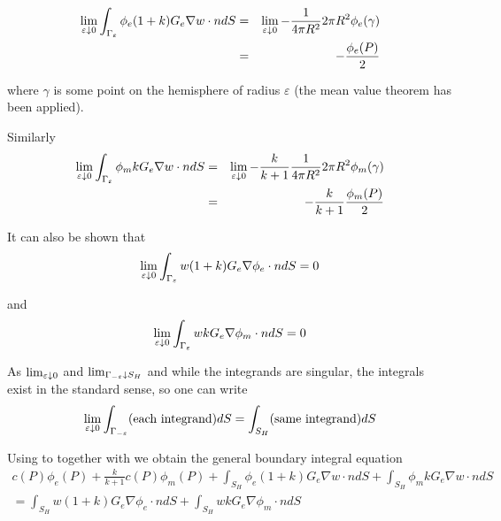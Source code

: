 \begin{eqnarray}
        \limita{\varepsilon}{0}{\int_{\Gamma _{\varepsilon }}
        \phi_{e}(1+k)G_{e}\nabla w\cdot ndS}
        &=&
        \limita{\varepsilon}{0}
                {-\frac{1}{4\pi R^{2}}2\pi R^{2}\phi _{e}(\gamma )}\nonumber \\
        &=& -\frac{\phi_{e}(P)}{2}
        \label{limit1}
\end{eqnarray}

where $\gamma $ is some point on the hemisphere of radius $\varepsilon $
(the mean value theorem has been applied).

Similarly 
\begin{eqnarray}
\limita{\varepsilon}{0}
        {\int_{\Gamma _{\varepsilon }}\phi_{m}kG_{e}\nabla w\cdot ndS}
        &=&
        \limita{\varepsilon}{0}
                {-\frac{k}{k+1}\frac{1}{4\pi R^{2}}2\pi R^{2}\phi _{m}(\gamma )}  \nonumber \\
                &=&
        -\frac{k}{k+1}\frac{\phi _{m}(P)}{2}
        \label{limit2}
\end{eqnarray}

It can also be shown that 
\begin{equation}
        \limita{\varepsilon}{0}
                {\int_{\Gamma _{\varepsilon}}w(1+k)G_{e}\nabla \phi _{e}\cdot ndS}=0
        \label{limit3}
\end{equation}

and 
\begin{equation}
        \limita{\varepsilon}{0}
        {\int_{\Gamma _{\varepsilon}}wkG_{e}\nabla \phi _{m}\cdot ndS} =0
        \label{limit4}
\end{equation}

As $\limita{\varepsilon}{0}{}$ and $\limita{\Gamma _{-\varepsilon}}{S_{H}}{}$ and
while the integrands are singular, the integrals exist in the 
standard sense, so one can write 
\begin{equation}
        \limita{\varepsilon}{0}
        {\int_{\Gamma_{-\varepsilon}}(\text{each integrand})dS}
        =\int_{S_{H}}(\text{same integrand})dS  
        \label{limit5}
\end{equation}

Using  to  together with 
we obtain the general boundary integral equation 
\begin{multline}
        c(P)\phi _{e}(P)+\frac{k}{k+1}c(P)\phi _{m}(P)+   
        \int_{S_{H}}\phi _{e}(1+k)G_{e}\nabla w\cdot ndS+   
        \int_{S_{H}}\phi _{m}kG_{e}\nabla w\cdot ndS                    \\
        =\int_{S_{H}}w(1+k)G_{e}\nabla \phi _{e}\cdot ndS +
        \int_{S_{H}}wkG_{e}\nabla \phi _{m}\cdot ndS  
        \label{BIE eqtn_final}
\end{multline}

